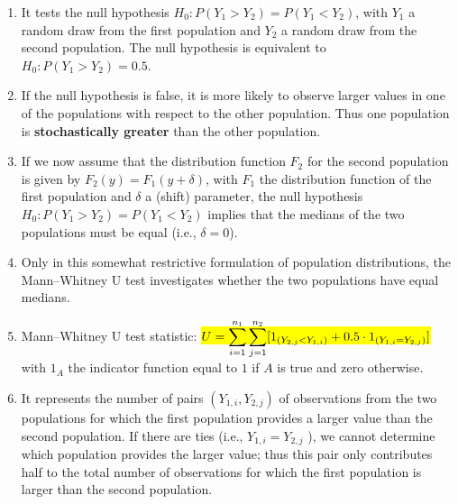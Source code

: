\begin{enumerate}
    \item  It tests the null hypothesis $H_0 : P(Y_1 > Y_2) = P(Y_1 < Y_2)$, with $Y_1$ a random draw from the first population and $Y_2$ a random draw from the second population.
    The null hypothesis is equivalent to $H_0 : P(Y_1 > Y_2) = 0.5$.
    \hfill \cite{statistics/book/Statistics-for-Data-Scientists/Maurits-Kaptein}

    \item  If the null hypothesis is false, it is more likely to observe larger values in one of the populations with respect to the other population. 
    Thus one population is \textbf{stochastically greater} than the other population.
    \hfill \cite{statistics/book/Statistics-for-Data-Scientists/Maurits-Kaptein}

    \item If we now assume that the distribution function $F_2$ for the second population is given by $F_2(y) = F_1(y + \delta)$, with $F_1$ the distribution function of the first population and $\delta$ a (shift) parameter, the null hypothesis $H_0 : P(Y_1 > Y_2) = P(Y_1 < Y_2)$ implies that the medians of the two populations must be equal (i.e., $\delta = 0$). 
    \hfill \cite{statistics/book/Statistics-for-Data-Scientists/Maurits-Kaptein}

    \item Only in this somewhat restrictive formulation of population distributions, the Mann–Whitney U test investigates whether the two populations have equal medians.
    \hfill \cite{statistics/book/Statistics-for-Data-Scientists/Maurits-Kaptein}

    \item Mann–Whitney U test statistic: 
    \colorbox{yellow}{$
        U = 
        \displaystyle\sum^{n_1} _{i=1} 
        \displaystyle\sum^{n_2} _{j=1} 
        [1_{(Y_{2, j} <Y_{1,i} )} + 0.5 \cdot 1_{(Y_{1,i} =Y_{2, j} )}]
    $}
    \hfill \cite{statistics/book/Statistics-for-Data-Scientists/Maurits-Kaptein}
    \\[0.2cm]
    with $1_A$ the indicator function equal to $1$ if $A$ is true and zero otherwise.
    \hfill \cite{statistics/book/Statistics-for-Data-Scientists/Maurits-Kaptein}

    \item  It represents the number of pairs $(Y_{1,i} , Y_{2, j} )$ of observations from the two populations for which the first population provides a larger value than the second population. 
    If there are ties (i.e., $Y_{1,i} = Y_{2, j}$ ), we cannot determine which population provides the larger value; thus this pair only contributes half to the total number of observations for which the first population is larger than the second population.
    \hfill \cite{statistics/book/Statistics-for-Data-Scientists/Maurits-Kaptein}


\end{enumerate}
